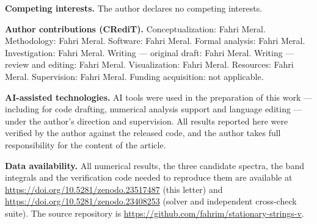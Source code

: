 \documentclass[twocolumn]{svjour3}
\begin{document}
\textbf{Competing interests.} The author declares no competing
interests.

\textbf{Author contributions (CRediT).} Conceptualization: Fahri
Meral. Methodology: Fahri Meral. Software: Fahri Meral. Formal
analysis: Fahri Meral. Investigation: Fahri Meral. Writing ---
original draft: Fahri Meral. Writing --- review and editing: Fahri
Meral. Visualization: Fahri Meral. Resources: Fahri Meral.
Supervision: Fahri Meral. Funding acquisition: not applicable.

\textbf{AI-assisted technologies.} AI tools were used in the
preparation of this work --- including for code drafting, numerical
analysis support and language editing --- under the author's
direction and supervision. All results reported here were verified
by the author against the released code, and the author takes full
responsibility for the content of the article.

\textbf{Data availability.} All numerical results, the three candidate
spectra, the band integrals and the verification code needed to
reproduce them are available at
\url{https://doi.org/10.5281/zenodo.23517487} (this letter) and
\url{https://doi.org/10.5281/zenodo.23408253} (solver and
independent cross-check suite). The source repository is
\url{https://github.com/fahrim/stationary-strings-v}.

\nocite{ps95}



\end{document}
